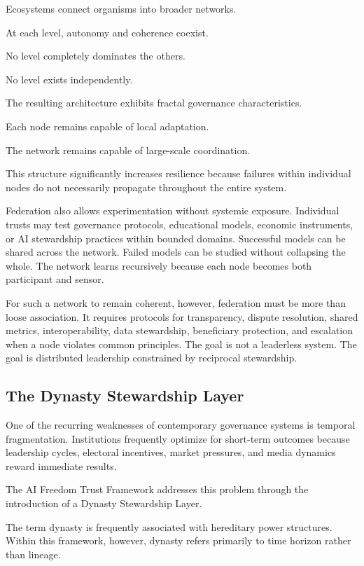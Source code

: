 \documentclass[12pt]{article}
\begin{document}
Ecosystems connect organisms into broader networks.

At each level, autonomy and coherence coexist.

No level completely dominates the others.

No level exists independently.

The resulting architecture exhibits fractal governance characteristics.

Each node remains capable of local adaptation.

The network remains capable of large-scale coordination.

This structure significantly increases resilience because failures within individual nodes do not necessarily propagate throughout the entire system.

Federation also allows experimentation without systemic exposure. Individual trusts may test governance protocols, educational models, economic instruments, or AI stewardship practices within bounded domains. Successful models can be shared across the network. Failed models can be studied without collapsing the whole. The network learns recursively because each node becomes both participant and sensor.

For such a network to remain coherent, however, federation must be more than loose association. It requires protocols for transparency, dispute resolution, shared metrics, interoperability, data stewardship, beneficiary protection, and escalation when a node violates common principles. The goal is not a leaderless system. The goal is distributed leadership constrained by reciprocal stewardship.

\subsection{The Dynasty Stewardship Layer}

One of the recurring weaknesses of contemporary governance systems is temporal fragmentation. Institutions frequently optimize for short-term outcomes because leadership cycles, electoral incentives, market pressures, and media dynamics reward immediate results.

The AI Freedom Trust Framework addresses this problem through the introduction of a Dynasty Stewardship Layer.

The term dynasty is frequently associated with hereditary power structures. Within this framework, however, dynasty refers primarily to time horizon rather than lineage.
\end{document}

